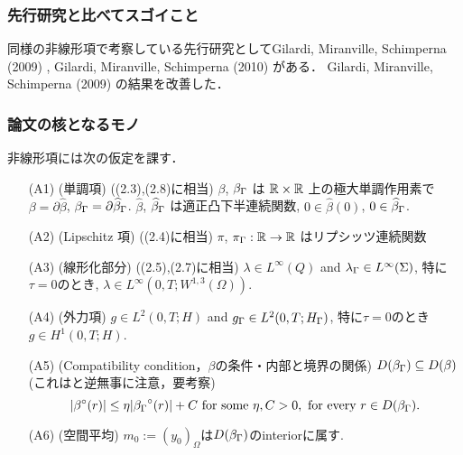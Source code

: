 \documentclass[openary, a4paper, oneside]{jsarticle}
\begin{document}
	\subsubsection{先行研究と比べてスゴイこと}
	同様の非線形項で考察している先行研究としてGilardi, Miranville, Schimperna (2009) \cite{GilardiMiranvilleSchimperna2009}, Gilardi, Miranville, Schimperna (2010) \cite{GilardiMiranvilleSchimperna2010}がある．
	Gilardi, Miranville, Schimperna (2009) \cite{GilardiMiranvilleSchimperna2009} の結果を改善した．
	\subsubsection{論文の核となるモノ}
	非線形項には次の仮定を課す．
	\begin{itemize}
		\item[(A1)] (単調項) ((2.3),(2.8)に相当) $\beta$, $\beta_{\Gamma}$ は $\mathbb{R}\times\mathbb{R}$ 上の極大単調作用素で $\beta = \partial\hat{\beta}$, $\beta_{\Gamma} = \partial\widehat{\beta}_{\Gamma}$.
		$\hat{\beta}$, $\widehat{\beta}_{\Gamma}$ は適正凸下半連続関数, $0 \in \hat{\beta}(0)$, $0 \in \widehat{\beta}_{\Gamma}$.
		\item[(A2)] (Lipschitz 項) ((2.4)に相当) $\pi$, $\pi_{\Gamma}:\mathbb{R}\to\mathbb{R}$ はリプシッツ連続関数
		\item[(A3)] (線形化部分) ((2.5),(2.7)に相当) $\lambda\in L^{\infty}(Q)$ and $\lambda_{\Gamma}\in L^{\infty}(\Sigma)$, 特に$\tau=0$のとき, $\lambda\in L^{\infty}(0,T;W^{1,3}(\Omega))$.
		\item[(A4)] (外力項) $g\in L^2(0,T;H)$ and $g_{\Gamma}\in L^2(0,T;H_{\Gamma})$, 特に$\tau=0$のとき$g\in H^1(0,T;H)$.
		\item[(A5)] (Compatibility condition，$\beta$の条件・内部と境界の関係) $D(\beta_{\Gamma}) \subseteq D(\beta)$(これは\cite{GilardiMiranvilleSchimperna2009}と逆無事に注意，要考察)
		\begin{equation}
			|{\beta}^{\circ}(r)| \leq \eta|{\beta_{\Gamma}}^{\circ}(r)| + C \text{ for some }\eta, C > 0, \text{ for every }r\in D(\beta_{\Gamma}).
		\end{equation} 
		\item[(A6)] (空間平均) $m_0:=(y_0)_{\Omega}$は$D(\beta_{\Gamma})$のinteriorに属す.
	\end{itemize}
\end{document}
